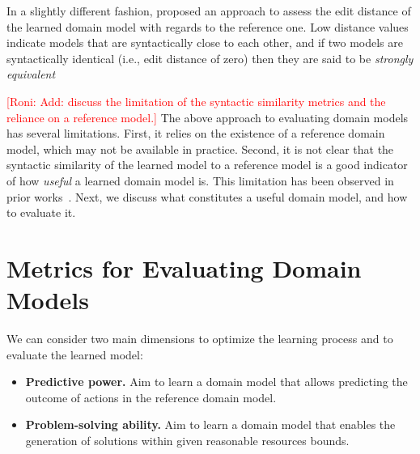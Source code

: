 \documentclass{article}
\theoremstyle{definition}
\theoremstyle{remark}
\newcommand{\roni}[1]{{\textcolor{red}{[Roni: #1]}}}
\newcommand{\mauro}[1]{{\textcolor{green}{[Mauro: #1]}}}
\begin{document}

In a slightly different fashion, \cite{chrpa2023comparing} proposed an approach to assess the edit distance of the learned domain model with regards to the reference one. Low distance values indicate models that are syntactically close to each other, and if two models are syntactically identical (i.e., edit distance of zero) then they are said to be \textit{strongly equivalent} \cite{chrpa2023comparing}



\roni{Add: discuss the limitation of the syntactic similarity metrics and the reliance on a reference model.}
The above approach to evaluating domain models has several limitations. 
First, it relies on the existence of a reference domain model, which may not be available in practice. 
Second, it is not clear that the syntactic similarity of the learned model to a reference model is a good indicator of how \emph{useful} a learned domain model is. This limitation has been observed in prior works~\cite{aineto2019learning,juba2021safe,mordoch2024safe}.
Next, we discuss what constitutes a useful domain model, and how to evaluate it.



\section{Metrics for Evaluating Domain Models}

We can consider two main dimensions to optimize the learning process and to evaluate the learned model:
%
\begin{itemize}
    \item \textbf{Predictive power.} Aim to learn a domain model that allows predicting the outcome of actions in the reference domain model. 
    \item \textbf{Problem-solving ability.} Aim to learn a domain model that enables the generation of solutions within given reasonable resources bounds. %
\end{itemize}
\end{document}
